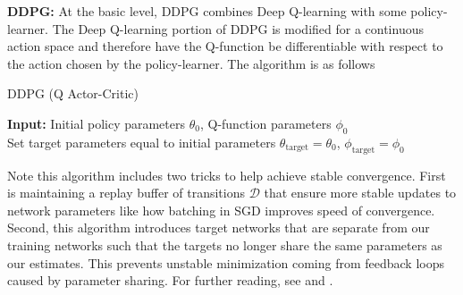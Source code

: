 \documentclass[12pt]{article}
\begin{document}
\textbf{DDPG:} At the basic level, DDPG combines Deep Q-learning with some policy-learner. The Deep Q-learning portion of DDPG is modified for a continuous action space and therefore have the Q-function be differentiable with respect to the action chosen by the policy-learner. The algorithm is as follows

\medskip

\begin{minipage}{0.95\linewidth}
\begin{algorithm}[H]
  \SetAlgoLined
  \caption{DDPG (Q Actor-Critic)}
  \textbf{Input:} Initial policy parameters $\theta_0$, Q-function parameters $\phi_0$ \\
  Set target parameters equal to initial parameters $\theta_{\text{target}} = \theta_0$, $\phi_{\text{target}} = \phi_0$ \\
  \label{algo:PPO}
\end{algorithm}
\end{minipage}

\medskip

Note this algorithm includes two tricks to help achieve stable convergence. First is maintaining a replay buffer of transitions $\mathcal{D}$ that ensure more stable updates to network parameters like how batching in SGD improves speed of convergence. Second, this algorithm introduces target networks that are separate from our training networks such that the targets no longer share the same parameters as our estimates. This prevents unstable minimization coming from feedback loops caused by parameter sharing. For further reading, see \cite{Silver2014} and \cite{Lillicrap2019}. \\
\end{document}
